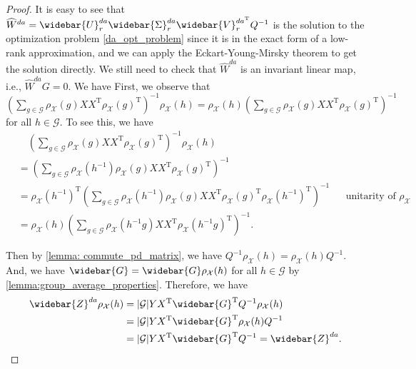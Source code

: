 \documentclass{article}
\newcommand{\T}{\mathrm{T}}
\theoremstyle{plain}
\theoremstyle{definition}
\theoremstyle{remark}
\theoremstyle{remark}
\begin{document}
    
    \globaloptimada*
    \begin{proof}
      It is easy to see that $\widehat{W}^{da} =  \widebar{U}_r^{da} \widebar{\Sigma}_r^{da} {\widebar{V}_r^{da^{\T}}} Q^{-1}$ is the solution to the optimization problem \ref{da_opt_problem} since it is in the exact form of a low-rank approximation, and we can apply the Eckart-Young-Mirsky theorem \citet{eckart1936} to get the solution directly. We still need to check that $\widehat{W}^{da}$ is an invariant linear map, i.e., $\widehat{W}^{da} G = 0$. We have 
      First, we observe that $\left(\sum_{g \in \mathcal{G}} \rho_{\mathcal{X}}(g)XX^{\T} {\rho_{\mathcal{X}}(g)}^{\T}\right)^{-1}\rho_{\mathcal{X}}(h) = {\rho_{\mathcal{X}}(h)} \left(\sum_{g \in \mathcal{G}} \rho_{\mathcal{X}}(g)XX^{\T} {\rho_{\mathcal{X}}(g)}^{\T}\right)^{-1}$ for all $h \in \mathcal{G}$.
      To see this, we have
      \begin{align}
        &\quad \left(\sum_{g \in \mathcal{G}} \rho_{\mathcal{X}}(g)XX^{\T} {\rho_{\mathcal{X}}(g)}^{\T}\right)^{-1}\rho_{\mathcal{X}}(h) \nonumber \\
        &= \left(\sum_{g \in \mathcal{G}} \rho_{\mathcal{X}}(h^{-1}) \rho_{\mathcal{X}}(g)XX^{\T} {\rho_{\mathcal{X}}(g)}^{\T}\right)^{-1} \nonumber \\
        &= {\rho_{\mathcal{X}}(h^{-1})}^{\T} \left(\sum_{g \in \mathcal{G}} \rho_{\mathcal{X}}(h^{-1}) \rho_{\mathcal{X}}(g)XX^{\T} {\rho_{\mathcal{X}}(g)}^{\T} {\rho_{\mathcal{X}}(h^{-1})}^{\T}\right)^{-1} && \text{unitarity of $\rho_{\mathcal{X}}$} \nonumber \\
        &= {\rho_{\mathcal{X}}(h)} \left(\sum_{g \in \mathcal{G}} \rho_{\mathcal{X}}(h^{-1}g)XX^{\T} {\rho_{\mathcal{X}}(h^{-1}g)}^{\T}\right)^{-1}.
      \end{align}

      Then by \autoref{lemma: commute_pd_matrix}, we have $Q^{-1} \rho_{\mathcal{X}}(h) = \rho_{\mathcal{X}}(h) Q^{-1}$. And, we have $\widebar{G} = \widebar{G} \rho_{\mathcal{X}}(h)$ for all $h \in \mathcal{G}$ by \autoref{lemma:group_average_properties}. Therefore, we have
      \begin{align}
        \widebar{Z}^{da} \rho_{\mathcal{X}}(h) &= |\mathcal{G}|Y X^{\T} \widebar{G}^{\T} Q^{-1} \rho_{\mathcal{X}}(h) \nonumber \\
        &= |\mathcal{G}|Y X^{\T} \widebar{G}^{\T}  \rho_{\mathcal{X}}(h) Q^{-1} \nonumber \\
        &= |\mathcal{G}|Y X^{\T} \widebar{G}^{\T}  Q^{-1} = \widebar{Z}^{da}.
      \end{align}
      

\end{proof}
\end{document}
